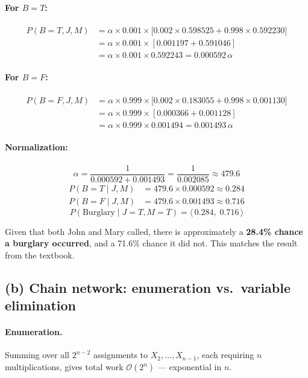 \documentclass[12pt]{article}
\begin{document}
\paragraph{For $B=T$:}
\begin{align*}
P(B{=}T,J,M)
  &=\alpha\times0.001\times\bigl[0.002\times0.598525+0.998\times0.592230\bigr]\\
  &=\alpha\times0.001\times[0.001197+0.591046]\\
  &=\alpha\times0.001\times0.592243
   =0.000592\,\alpha
\end{align*}

\paragraph{For $B=F$:}
\begin{align*}
P(B{=}F,J,M)
  &=\alpha\times0.999\times\bigl[0.002\times0.183055+0.998\times0.001130\bigr]\\
  &=\alpha\times0.999\times[0.000366+0.001128]\\
  &=\alpha\times0.999\times0.001494
   =0.001493\,\alpha
\end{align*}

\paragraph{Normalization:}
\[
\alpha=\frac{1}{0.000592+0.001493}=\frac{1}{0.002085}\approx479.6
\]
\begin{align*}
P(B{=}T\mid J,M)&=479.6\times0.000592\approx0.284\\
P(B{=}F\mid J,M)&=479.6\times0.001493\approx0.716
\end{align*}
\[
\boxed{P(\text{Burglary}\mid J{=}T,M{=}T)=\langle\,0.284,\;0.716\,\rangle}
\]

Given that both John and Mary called, there is approximately a \textbf{28.4\% chance a burglary occurred},
and a 71.6\% chance it did not. This matches the result from the textbook.

\subsection*{(b) Chain network: enumeration vs.\ variable elimination}

\paragraph{Enumeration.}
Summing over all $2^{n-2}$ assignments to $X_2,\ldots,X_{n-1}$, each requiring
$n$ multiplications, gives total work $\mathcal{O}(2^n)$ --- exponential in $n$.
\end{document}
